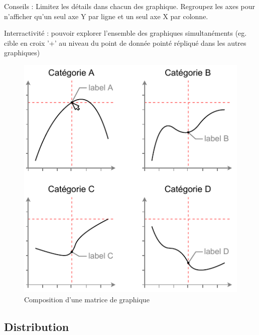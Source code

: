 \documentclass[a4paper,12pt]{article}
\begin{document}
\begin{multicols}{2}
Conseils : Limitez les détails dans chacun des graphique. \autocite{sosulskiGraphics2019} Regroupez les axes pour n'afficher qu'un seul axe Y par ligne et un seul axe X par colonne.

Interractivité : pouvoir explorer l'ensemble des graphiques simultanéments (eg. cible en croix '+' au niveau du point de donnée pointé répliqué dans les autres graphiques)

\begin{figure}[H]
\centering
\includegraphics[width=.9\linewidth]{./img/small-multiple.pdf}
\caption{\label{fig:orgeda892b}Composition d'une matrice de graphique}
\end{figure}
\subsection*{Distribution}
\label{sec:org3892205}


\end{multicols}
\end{document}

